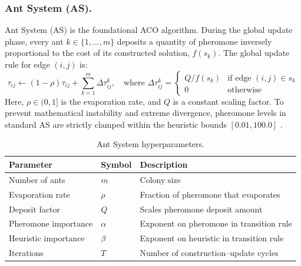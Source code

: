 \subsubsection{Ant System (AS).}
Ant System (AS) is the foundational ACO algorithm. During the global update phase, every ant $k \in \{1, \dots, m\}$ deposits a quantity of pheromone inversely proportional to the cost of its constructed solution, $f(s_k)$. The global update rule for edge $(i,j)$ is:
\begin{equation}
    \tau_{ij} \gets (1 - \rho)\tau_{ij} + \sum_{k=1}^m \Delta \tau_{ij}^k, \quad \text{where } \Delta \tau_{ij}^k = \begin{cases} Q / f(s_k) & \text{if edge } (i,j) \in s_k \\ 0 & \text{otherwise} \end{cases}
\end{equation}
Here, $\rho \in (0,1]$ is the evaporation rate, and $Q$ is a constant scaling factor. To prevent mathematical instability and extreme divergence, pheromone levels in standard AS are strictly clamped within the heuristic bounds $[0.01, 100.0]$ \autocite{DorigoBirattariStutzle2007}.

\begin{table}[H]
\centering
\caption{Ant System hyperparameters.}
\label{tab:as-params}
\begin{tabular}{l l p{7cm}}
\hline
\textbf{Parameter} & \textbf{Symbol} & \textbf{Description} \\
\hline
Number of ants        & $m$         & Colony size \\
Evaporation rate      & $\rho$      & Fraction of pheromone that evaporates \\
Deposit factor        & $Q$         & Scales pheromone deposit amount \\
Pheromone importance  & $\alpha$    & Exponent on pheromone in transition rule \\
Heuristic importance  & $\beta$     & Exponent on heuristic in transition rule \\
Iterations            & $T$         & Number of construction--update cycles \\
\hline
\end{tabular}
\end{table}

